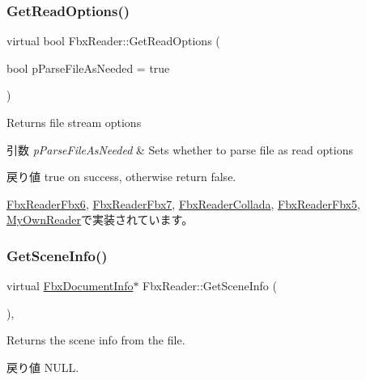 \subsubsection{\texorpdfstring{Get\+Read\+Options()}{GetReadOptions()}}
{\footnotesize\ttfamily virtual bool Fbx\+Reader\+::\+Get\+Read\+Options (\begin{DoxyParamCaption}\item[{bool}]{p\+Parse\+File\+As\+Needed = {\ttfamily true} }\end{DoxyParamCaption})\hspace{0.3cm}{\ttfamily [pure virtual]}}

Returns file stream options 
\begin{DoxyParams}{引数}
{\em p\+Parse\+File\+As\+Needed} & Sets whether to parse file as read options \\
\hline
\end{DoxyParams}
\begin{DoxyReturn}{戻り値}
true on success, otherwise return false. 
\end{DoxyReturn}


\hyperlink{class_fbx_reader_fbx6_afe24d36b1c38806c9ace6a6d1a782b88}{Fbx\+Reader\+Fbx6}, \hyperlink{class_fbx_reader_fbx7_ac8d749c6a5f5c47573f27c26383401de}{Fbx\+Reader\+Fbx7}, \hyperlink{class_fbx_reader_collada_a23cea871d527b8695ebdeade47b1938e}{Fbx\+Reader\+Collada}, \hyperlink{class_fbx_reader_fbx5_a30c6a2a6f02fddffecec9cabf9f51ed7}{Fbx\+Reader\+Fbx5}, \hyperlink{class_my_own_reader_a0ce8b8bc4f216b5e87574796aa973219}{My\+Own\+Reader}で実装されています。

\mbox{\label{class_fbx_reader_acb928634641ad5f99d709478c7a234be}} 
\subsubsection{\texorpdfstring{Get\+Scene\+Info()}{GetSceneInfo()}}
{\footnotesize\ttfamily virtual \hyperlink{class_fbx_document_info}{Fbx\+Document\+Info}$\ast$ Fbx\+Reader\+::\+Get\+Scene\+Info (\begin{DoxyParamCaption}{ }\end{DoxyParamCaption})\hspace{0.3cm}{\ttfamily [inline]}, {\ttfamily [virtual]}}

Returns the scene info from the file. \begin{DoxyReturn}{戻り値}
N\+U\+LL. 
\end{DoxyReturn}


